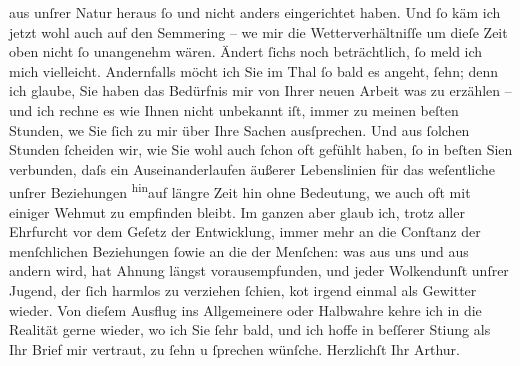 \begin{ledgroupsized}[t]{13cm}
               aus unſrer Natur heraus ſo und nicht anders eingerichtet haben. Und ſo käm ich jetzt
               wohl auch auf den Semmering – we{\geminationn} mir die Wetterverhältniſſe um dieſe Zeit oben nicht ſo
               unangenehm wären. Ändert ſichs noch beträchtlich, ſo meld ich mich vielleicht.
               Andernfalls möcht ich Sie im Thal ſo bald es angeht, ſehn; denn ich glaube, {\pb}Sie haben das Bedürfnis mir von Ihrer neuen Arbeit was zu erzählen – und
               ich rechne es wie Ihnen nicht unbekannt iſt, immer zu meinen beſten Stunden, we{\geminationn} Sie ſich zu mir über Ihre Sachen ausſprechen. Und aus
               ſolchen Stunden ſcheiden wir, wie Sie wohl auch ſchon oft gefühlt haben, ſo in beſten
                  Si{\geminationn}en verbunden, daſs ein Auseinanderlaufen äußerer
               Lebenslinien für das weſentliche unſrer Beziehungen \substVorne{}\textsuperscript{hin}\substDazwischen{}auf\substHinten{} längre Zeit \introOben{}hin\introOben{} ohne Bedeutung, we{\geminationn} auch oft mit einiger Wehmut zu empfinden bleibt. Im
               ganzen aber glaub ich, trotz aller Ehrfurcht vor dem Geſetz der Entwicklung, immer
               mehr an die Conſtanz der \introOben{}menſchlichen\introOben{} Beziehungen \introOben{}ſo\introOben{}wie an die der Menſchen: was aus uns und aus andern wird,
               hat Ahnung längst vorausempfunden, und jeder Wolkendunſt unſrer Jugend, der ſich
               harmlos zu verziehen ſchien, ko{\geminationm}t irgend einmal als
               Gewitter wieder. Von dieſem Ausflug ins Allgemeinere oder Halbwahre kehre ich in die
               Realität gerne wieder, wo ich Sie ſehr bald, und ich hoffe in beſſerer Sti{\geminationm}ung als Ihr Brief mir vertraut, zu ſehn u ſprechen
               wünſche.\pend
           \pstart Herzlichſt Ihr \spacefill\mbox{Arthur.}\pend{}
         
         \endnumbering{}\end{ledgroupsized}  \newcommand{\dateiname}{L02168}\newcommand{\titel}{Arthur Schnitzler an Hugo von Hofmannsthal, 28. 3. 1914}\newcommand{\editorInnen}{Martin Anton Müller und Gerd-Hermann Susen}
      